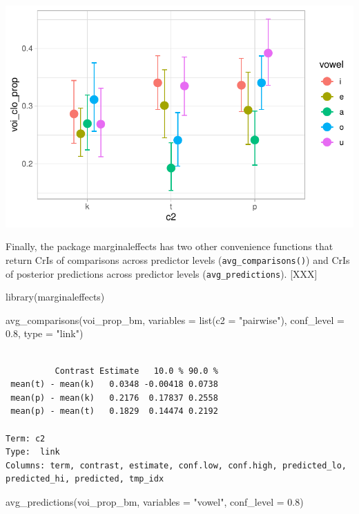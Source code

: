 \documentclass[
  authoryear,
  preprint,
  3p]{elsarticle}
\newenvironment{Shaded}{\begin{snugshade}}{\end{snugshade}}
\newcommand{\AttributeTok}[1]{\textcolor[rgb]{0.40,0.45,0.13}{#1}}
\newcommand{\FloatTok}[1]{\textcolor[rgb]{0.68,0.00,0.00}{#1}}
\newcommand{\FunctionTok}[1]{\textcolor[rgb]{0.28,0.35,0.67}{#1}}
\newcommand{\NormalTok}[1]{\textcolor[rgb]{0.00,0.23,0.31}{#1}}
\newcommand{\StringTok}[1]{\textcolor[rgb]{0.13,0.47,0.30}{#1}}
\begin{document}
\includegraphics{manuscript_files/figure-pdf/voi-prop-bm-cond-1.pdf}

Finally, the package marginaleffects has two other convenience functions
that return CrIs of comparisons across predictor levels
(\texttt{avg\_comparisons()}) and CrIs of posterior predictions across
predictor levels (\texttt{avg\_predictions}). {[}XXX{]}

\begin{Shaded}
\begin{Highlighting}[]
\FunctionTok{library}\NormalTok{(marginaleffects)}

\FunctionTok{avg\_comparisons}\NormalTok{(voi\_prop\_bm, }\AttributeTok{variables =} \FunctionTok{list}\NormalTok{(}\AttributeTok{c2 =} \StringTok{"pairwise"}\NormalTok{), }\AttributeTok{conf\_level =} \FloatTok{0.8}\NormalTok{, }\AttributeTok{type =} \StringTok{"link"}\NormalTok{)}
\end{Highlighting}
\end{Shaded}

\begin{verbatim}

          Contrast Estimate   10.0 % 90.0 %
 mean(t) - mean(k)   0.0348 -0.00418 0.0738
 mean(p) - mean(k)   0.2176  0.17837 0.2558
 mean(p) - mean(t)   0.1829  0.14474 0.2192

Term: c2
Type:  link 
Columns: term, contrast, estimate, conf.low, conf.high, predicted_lo, predicted_hi, predicted, tmp_idx 
\end{verbatim}

\begin{Shaded}
\begin{Highlighting}[]
\FunctionTok{avg\_predictions}\NormalTok{(voi\_prop\_bm, }\AttributeTok{variables =} \StringTok{"vowel"}\NormalTok{, }\AttributeTok{conf\_level =} \FloatTok{0.8}\NormalTok{)}
\end{Highlighting}
\end{Shaded}
\end{document}
